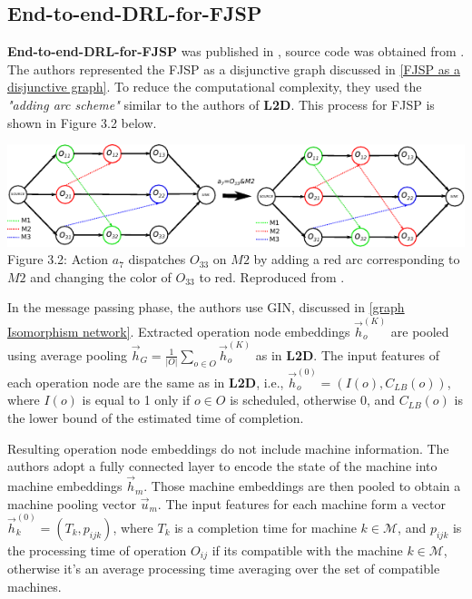 \subsection{End-to-end-DRL-for-FJSP} 

\textbf{End-to-end-DRL-for-FJSP} was published in \cite{LEI2022117796}, source code was obtained from \cite{github_end_to_end_drl_for_fjsp}. The authors represented the FJSP as a disjunctive graph discussed in \ref{FJSP as a disjunctive graph}. To reduce the computational complexity, they used the \textit{"adding arc scheme"} similar to the authors of \textbf{L2D}. This process for FJSP is shown in Figure 3.2 below.
\begin{center}
    \includegraphics[width=\linewidth]{images/fjsp_adding_arcs.pdf}\\
    Figure 3.2: Action $a_7$ dispatches $O_{33}$ on $M2$ by adding a red arc corresponding to $M2$ and changing the color of $O_{33}$ to red. Reproduced from \cite{LEI2022117796}.
\end{center}
In the message passing phase, the authors use GIN, discussed in \ref{graph Isomorphism network}. Extracted operation node embeddings $\vec{h}_o^{(K)}$ are pooled using average pooling $\vec{h}_G = \frac{1}{|O|} \sum_{o \in O} \vec{h}_o^{(K)}$ as in \textbf{L2D}. The input features of each operation node are the same as in \textbf{L2D}, i.e., $\vec{h}_o^{(0)} = (I(o), C_{LB}(o))$, where $I(o)$ is equal to 1 only if $o \in O$ is scheduled, otherwise 0, and $C_{LB}(o)$ is the lower bound of the estimated time of completion.
\par
Resulting operation node embeddings do not include machine information. The authors adopt a fully connected layer to encode the state of the machine into machine embeddings $\vec{h}_m$. Those machine embeddings are then pooled to obtain a machine pooling vector $\vec{u}_m$. The input features for each machine form a vector $\vec{h}^{(0)}_k = \left ( T_k,p_{ijk}\right )$, where $T_k$ is a completion time for machine $k \in \mathcal{M}$, and $p_{ijk}$ is the processing time of operation $O_{ij}$ if its compatible with the machine $k \in \mathcal{M}$, otherwise it's an average processing time averaging over the set of compatible machines. 
